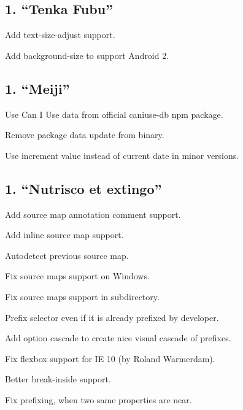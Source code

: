 \subsection*{1. “\+Tenka Fubu”}


\begin{DoxyItemize}
\item Add {\ttfamily text-\/size-\/adjust} support.
\item Add {\ttfamily background-\/size} to support Android 2.
\end{DoxyItemize}

\subsection*{1. “\+Meiji”}


\begin{DoxyItemize}
\item Use Can I Use data from official {\ttfamily caniuse-\/db} npm package.
\item Remove package data update from binary.
\item Use increment value instead of current date in minor versions.
\end{DoxyItemize}

\subsection*{1. “\+Nutrisco et extingo”}


\begin{DoxyItemize}
\item Add source map annotation comment support.
\item Add inline source map support.
\item Autodetect previous source map.
\item Fix source maps support on Windows.
\item Fix source maps support in subdirectory.
\item Prefix selector even if it is already prefixed by developer.
\item Add option {\ttfamily cascade} to create nice visual cascade of prefixes.
\item Fix flexbox support for IE 10 (by Roland Warmerdam).
\item Better {\ttfamily break-\/inside} support.
\item Fix prefixing, when two same properties are near.
\end{DoxyItemize}

